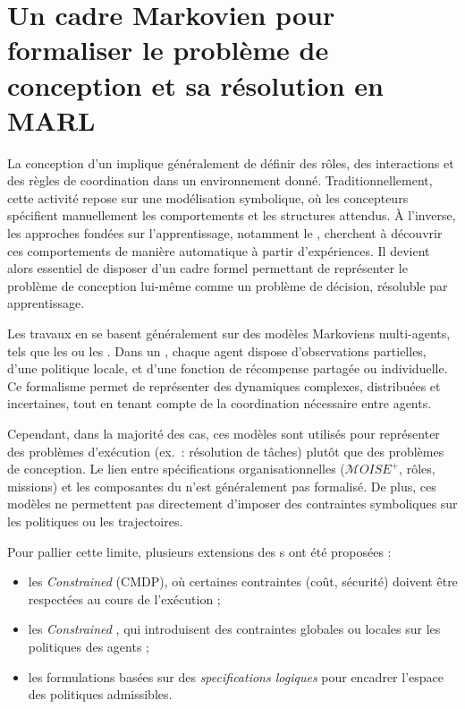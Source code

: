 \section{Un cadre Markovien pour formaliser le problème de conception et sa résolution en MARL}

\noindent
La conception d'un  implique généralement de définir des rôles, des interactions et des règles de coordination dans un environnement donné. Traditionnellement, cette activité repose sur une modélisation symbolique, où les concepteurs spécifient manuellement les comportements et les structures attendus. À l'inverse, les approches fondées sur l'apprentissage, notamment le , cherchent à découvrir ces comportements de manière automatique à partir d'expériences. Il devient alors essentiel de disposer d'un cadre formel permettant de représenter le problème de conception lui-même comme un problème de décision, résoluble par apprentissage.

\medskip

\noindent
Les travaux en  se basent généralement sur des modèles Markoviens multi-agents, tels que les  ou les . Dans un , chaque agent dispose d'observations partielles, d'une politique locale, et d'une fonction de récompense partagée ou individuelle. Ce formalisme permet de représenter des dynamiques complexes, distribuées et incertaines, tout en tenant compte de la coordination nécessaire entre agents.

\noindent
Cependant, dans la majorité des cas, ces modèles sont utilisés pour représenter des problèmes d'exécution (ex.~: résolution de tâches) plutôt que des problèmes de conception. Le lien entre spécifications organisationnelles ($\mathcal{M}OISE^+$, rôles, missions) et les composantes du  n'est généralement pas formalisé. De plus, ces modèles ne permettent pas directement d'imposer des contraintes symboliques sur les politiques ou les trajectoires.

\medskip

\noindent
Pour pallier cette limite, plusieurs extensions des s ont été proposées :
\begin{itemize}
    \item les \textit{Constrained } (CMDP), où certaines contraintes (coût, sécurité) doivent être respectées au cours de l'exécution ;
    \item les \textit{Constrained }, qui introduisent des contraintes globales ou locales sur les politiques des agents ;
    \item les formulations basées sur des \textit{specifications logiques} pour encadrer l'espace des politiques admissibles.
\end{itemize}

